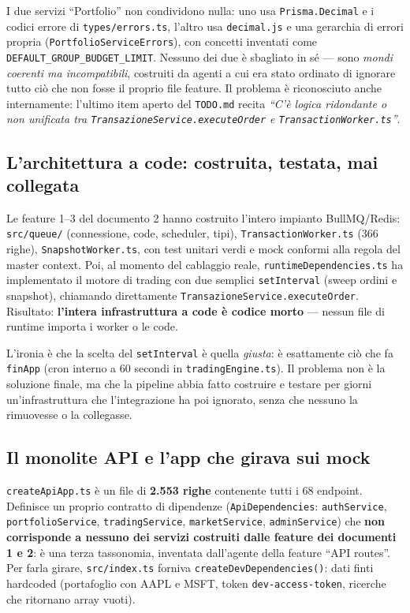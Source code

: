\documentclass[11pt,a4paper]{article}
\newcommand{\file}[1]{\texttt{\small #1}}
\begin{document}
I due servizi ``Portfolio'' non condividono nulla: uno usa \file{Prisma.Decimal} e i codici errore di \file{types/errors.ts}, l'altro usa \file{decimal.js} e una gerarchia di errori propria (\file{PortfolioServiceErrors}), con concetti inventati come \file{DEFAULT\_GROUP\_BUDGET\_LIMIT}. Nessuno dei due \`e sbagliato in s\'e --- sono \emph{mondi coerenti ma incompatibili}, costruiti da agenti a cui era stato ordinato di ignorare tutto ci\`o che non fosse il proprio file feature. Il problema \`e riconosciuto anche internamente: l'ultimo item aperto del \file{TODO.md} recita \emph{``C'\`e logica ridondante o non unificata tra \file{TransazioneService.executeOrder} e \file{TransactionWorker.ts}''}.

\subsection{L'architettura a code: costruita, testata, mai collegata}

Le feature 1--3 del documento 2 hanno costruito l'intero impianto BullMQ/Redis: \file{src/queue/} (connessione, code, scheduler, tipi), \file{TransactionWorker.ts} (366 righe), \file{SnapshotWorker.ts}, con test unitari verdi e mock conformi alla regola del master context. Poi, al momento del cablaggio reale, \file{runtimeDependencies.ts} ha implementato il motore di trading con due semplici \file{setInterval} (sweep ordini e snapshot), chiamando direttamente \file{TransazioneService.executeOrder}. Risultato: \textbf{l'intera infrastruttura a code \`e codice morto} --- nessun file di runtime importa i worker o le code.

L'ironia \`e che la scelta del \file{setInterval} \`e quella \emph{giusta}: \`e esattamente ci\`o che fa \file{finApp} (cron interno a 60 secondi in \file{tradingEngine.ts}). Il problema non \`e la soluzione finale, ma che la pipeline abbia fatto costruire e testare per giorni un'infrastruttura che l'integrazione ha poi ignorato, senza che nessuno la rimuovesse o la collegasse.

\subsection{Il monolite API e l'app che girava sui mock}

\file{createApiApp.ts} \`e un file di \textbf{2.553 righe} contenente tutti i 68 endpoint. Definisce un proprio contratto di dipendenze (\file{ApiDependencies}: \file{authService}, \file{portfolioService}, \file{tradingService}, \file{marketService}, \file{adminService}) che \textbf{non corrisponde a nessuno dei servizi costruiti dalle feature dei documenti 1 e 2}: \`e una terza tassonomia, inventata dall'agente della feature ``API routes''. Per farla girare, \file{src/index.ts} forniva \file{createDevDependencies()}: dati finti hardcoded (portafoglio con AAPL e MSFT, token \file{dev-access-token}, ricerche che ritornano array vuoti).
\end{document}
